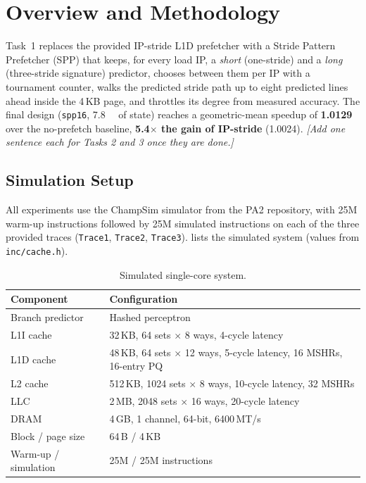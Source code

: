 \documentclass[11pt,a4paper]{article}
\newif\iffrontpage \frontpagetrue   %
\newif\iftoc       \toctrue   %
\newcommand{\doctitle}{Programming Assignment 2}
\newcommand{\docsubtitle}{Data Prefetching and Cache Replacement in ChampSim}
\newcommand{\docauthor}{}
\newcommand{\docaffil}{CS683: Advanced Computer Architecture}
\newcommand{\docdate}{\today}
\newcommand{\ifnotempty}[2]{\if\relax\detokenize\expandafter{#1}\relax\else#2\fi}
\newcommand{\makesimpletitle}{%
  \begin{center}
    {\color{accent}\rule{0.12\linewidth}{0.6pt}}\par\vspace{8pt}
    {\LARGE\scshape\color{accent}\doctitle\par}
    \ifnotempty{\docsubtitle}{\vspace{5pt}{\large\itshape\docsubtitle\par}}
    \vspace{8pt}
    {\normalsize\docauthor\par}
    {\small\itshape\color{muted}\docaffil\ifnotempty{\docdate}{\ifnotempty{\docaffil}{, }\docdate}\par}
    \vspace{6pt}{\color{accent}\rule{0.12\linewidth}{0.6pt}}
  \end{center}
  \vspace{8pt}
  \thispagestyle{plain}}
\newcommand{\makefrontpage}{%
  \begin{titlepage}
    \centering
    \vspace*{1.5cm}
    {\large\scshape\color{muted}\docaffil\par}
    \vspace{1.2cm}
    {\color{accent}\rule{\linewidth}{1.2pt}}\par\vspace{-8pt}
    {\color{accent}\rule{\linewidth}{0.4pt}}\par
    \vspace{1.1cm}
    {\fontsize{26}{32}\selectfont\scshape\color{accent}\doctitle\par}
    \ifnotempty{\docsubtitle}{\vspace{12pt}{\Large\itshape\docsubtitle\par}}
    \vspace{1.1cm}
    {\color{accent}\rule{\linewidth}{0.4pt}}\par\vspace{-8pt}
    {\color{accent}\rule{\linewidth}{1.2pt}}\par
    \vspace{2.2cm}
    \ifnotempty{\docauthor}{{\large\itshape by}\par\vspace{6pt}{\Large\scshape\docauthor\par}}
    \frontpageextra
    \vfill
    {\color{accent}\large$\diamond$}\par\vspace{6pt}
    {\large\docdate\par}
  \end{titlepage}}
\theoremstyle{themethm}
\theoremstyle{themedef}
\theoremstyle{themeex}
\theoremstyle{themerem}
\newcommand{\tablesetup}{%
  \arrayrulecolor{tablerule}%
  \setlength{\aboverulesep}{0pt}\setlength{\belowrulesep}{0pt}%
  \renewcommand{\arraystretch}{1.3}%
  \rowcolors{2}{white}{tablerow}}
\newcommand{\colhead}[1]{\textbf{\color{tableheadtext}#1}}
\newcommand{\maketoc}{%
  \begingroup\hypersetup{linkcolor=.}\tableofcontents\endgroup
  \iffrontpage\clearpage\else\par\vspace{4pt}{\color{accent!40}\hrule}\vspace{10pt}\fi}
\newcommand{\frontpageextra}{}   %
\newcommand{\teamname}{TeamName}
\newcommand{\teammembers}{%
  Advay Bapat \quad 23B1225\\
  Aniket Gupta \quad 23B1245\\
  Apoorv Goyal \quad 23B1266\\
  Kundan Maiti \quad 23B1242}
\renewcommand{\makefrontpage}{%
  \begin{titlepage}
    \centering
    \vspace*{1.5cm}
    {\rule{\linewidth}{1.2pt}}\par\vspace{-8pt}
    {\rule{\linewidth}{0.4pt}}\par
    \vspace{1cm}
    {\fontsize{26}{32}\selectfont\scshape\doctitle\par}
    \vspace{10pt}
    {\Large\itshape\docsubtitle\par}
    \vspace{1cm}
    {\rule{\linewidth}{0.4pt}}\par\vspace{-8pt}
    {\rule{\linewidth}{1.2pt}}\par
    \vspace{2.5cm}
    {\large\scshape Team \teamname\par}
    \vspace{0.5cm}
    {\large\teammembers\par}
    \vspace{0.8cm}
    {\large Department of Electrical Engineering\par}
    {\large Indian Institute of Technology Bombay\par}
    \vfill
    {\large\textbf{\docaffil}\par}
    \vspace{0.3cm}
    {\large\textbf{Date:} \docdate\par}
    \vspace{1cm}
  \end{titlepage}}
\newcommand{\todo}[1]{\textcolor{black!55}{\textit{[#1]}}}
\begin{document}
\iffrontpage\makefrontpage\else\makesimpletitle\fi
\iftoc\maketoc\fi

\section{Overview and Methodology}\label{sec:overview}

Task~1 replaces the provided IP-stride L1D prefetcher with a Stride Pattern
Prefetcher (SPP) that keeps, for every load IP, a \emph{short} (one-stride)
and a \emph{long} (three-stride signature) predictor, chooses between them per
IP with a tournament counter, walks the predicted stride path up to eight
predicted lines ahead inside the 4\,KB page, and throttles its degree from measured accuracy.
The final design (\texttt{spp16}, \SI{7.8}{\kilo\byte} of state) reaches a
geometric-mean speedup of \textbf{1.0129} over the no-prefetch baseline,
\textbf{5.4$\times$ the gain of IP-stride} (1.0024).
\todo{Add one sentence each for Tasks 2 and 3 once they are done.}

\subsection{Simulation Setup}\label{sec:setup}
All experiments use the ChampSim simulator from the PA2 repository, with
\num{25}M warm-up instructions followed by \num{25}M simulated instructions
on each of the three provided traces (\texttt{Trace1}, \texttt{Trace2},
\texttt{Trace3}).  lists the simulated system
(values from \texttt{inc/cache.h}).

\begin{table}[htbp]
\centering
\caption{Simulated single-core system.}\label{tab:config}
\tablesetup
\begin{tabular}{ll}
\toprule
\rowcolor{tablehead}\colhead{Component} & \colhead{Configuration} \\
\midrule
Branch predictor & Hashed perceptron \\
L1I cache & 32\,KB, 64 sets $\times$ 8 ways, 4-cycle latency \\
L1D cache & 48\,KB, 64 sets $\times$ 12 ways, 5-cycle latency, 16 MSHRs, 16-entry PQ \\
L2 cache  & 512\,KB, 1024 sets $\times$ 8 ways, 10-cycle latency, 32 MSHRs \\
LLC       & 2\,MB, 2048 sets $\times$ 16 ways, 20-cycle latency \\
DRAM      & 4\,GB, 1 channel, 64-bit, 6400\,MT/s \\
Block / page size & 64\,B / 4\,KB \\
Warm-up / simulation & 25M / 25M instructions \\
\bottomrule
\end{tabular}
\end{table}
\end{document}
